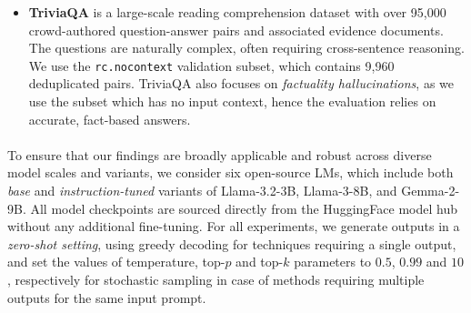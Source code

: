 \begin{itemize}
    \item[\textbf{(iv)}] \textbf{TriviaQA} \citep{joshi2017triviaqalargescaledistantly} is a large-scale reading comprehension dataset with over 95,000 crowd-authored question-answer pairs and associated evidence documents. The questions are naturally complex, often requiring cross-sentence reasoning. We use the \texttt{rc.nocontext} validation subset, which contains 9,960 deduplicated pairs. TriviaQA also focuses on \textit{factuality hallucinations}, as we use the subset which has no input context, hence the evaluation relies on accurate, fact-based answers.
\end{itemize}



\paragraph{} To ensure that our findings are broadly applicable and robust across diverse model scales and variants, we consider six open-source LMs, which include both \textit{base} and \textit{instruction-tuned} variants of Llama-3.2-3B, Llama-3-8B, and Gemma-2-9B. All model checkpoints are sourced directly from the HuggingFace model hub without any additional fine-tuning. For all experiments, we generate outputs in a \textit{zero-shot setting}, using greedy decoding for techniques requiring a single output, and set the values of temperature, top-$p$ and top-$k$ parameters to $0.5$, $0.99$ and $10$, respectively for stochastic sampling in case of methods requiring multiple outputs for the same input prompt. 

